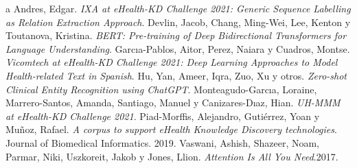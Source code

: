 \documentclass[10pt]{article} %
\begin{document}
%
%
%
%
%   	
	\begin{thebibliography}
		a
		 Andres, Edgar. \emph{IXA at eHealth-KD Challenge 2021: Generic Sequence Labelling as Relation Extraction Approach}.
		 Devlin, Jacob, Chang, Ming-Wei, Lee, Kenton y Toutanova, Kristina. \emph{BERT: Pre-training of Deep Bidirectional Transformers for Language Understanding}.
		 Garcıa-Pablos, Aitor, Perez, Naiara y Cuadros, Montse. \emph{Vicomtech at eHealth-KD Challenge 2021: Deep Learning Approaches to Model Health-related Text in Spanish}. 
		 Hu, Yan, Ameer, Iqra, Zuo, Xu y otros. \emph{Zero-shot Clinical Entity Recognition using ChatGPT}.
		 Monteagudo-Garcıa, Loraine, Marrero-Santos, Amanda, Santiago, Manuel y Canizares-Dıaz, Hian. \emph{UH-MMM at eHealth-KD Challenge 2021}. 
		 Piad-Morffis, Alejandro, Gutiérrez, Yoan y Muñoz, Rafael. \emph{A corpus to support eHealth Knowledge Discovery technologies}. Journal of Biomedical Informatics. 2019.		 
		 Vaswani, Ashish, Shazeer, Noam, Parmar, Niki, Uszkoreit, Jakob y Jones, Llion. \emph{Attention Is All You Need}.2017.
		
		
		
	
		
		
	\end{thebibliography}
\end{document}
